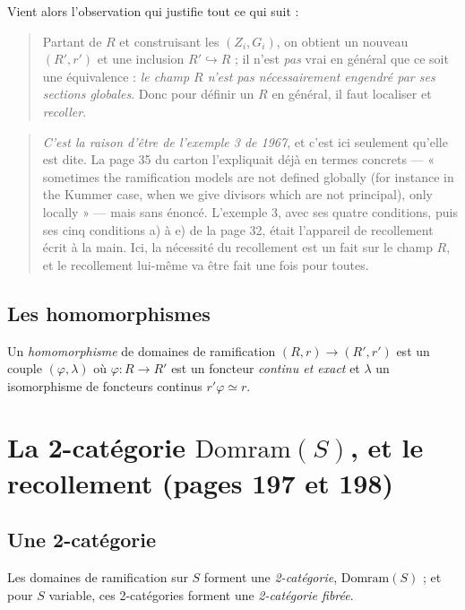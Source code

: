 \documentclass[11pt,a4paper]{article}
\begin{document}
Vient alors l'observation qui justifie tout ce qui suit :

\begin{quote}
Partant de $R$ et construisant les $(Z_{i}, G_{i})$, on obtient un nouveau
$(R', r')$ et une inclusion $R' \hookrightarrow R$ ; il n'est \emph{pas} vrai
en général que ce soit une équivalence : \emph{le champ $R$ n'est pas
nécessairement engendré par ses sections globales}. Donc pour définir un $R$ en
général, il faut localiser et \emph{recoller}.
\end{quote}

\begin{quote}
\emph{C'est la raison d'être de l'exemple 3 de 1967}, et c'est ici seulement
qu'elle est dite. La page 35 du carton l'expliquait déjà en termes concrets ---
« sometimes the ramification models are not defined globally (for instance in
the Kummer case, when we give divisors which are not principal), only locally »
--- mais sans énoncé. L'exemple 3, avec ses quatre conditions, puis ses cinq
conditions a) à e) de la page 32, était l'appareil de recollement écrit à la
main. Ici, la nécessité du recollement est un fait sur le champ $R$, et le
recollement lui-même va être fait une fois pour toutes.
\end{quote}

\subsection*{Les homomorphismes}

Un \emph{homomorphisme} de domaines de ramification $(R, r) \to (R', r')$ est
un couple $(\varphi, \lambda)$ où $\varphi : R \to R'$ est un foncteur
\emph{continu et exact} et $\lambda$ un isomorphisme de foncteurs continus
$r'\varphi \simeq r$.

\section*{La 2-catégorie $\mathrm{Domram}(S)$, et le recollement (pages 197 et 198)}

\subsection*{Une 2-catégorie}

Les domaines de ramification sur $S$ forment une \emph{2-catégorie},
$\mathrm{Domram}(S)$ ; et pour $S$ variable, ces 2-catégories forment une
\emph{2-catégorie fibrée}.
\end{document}
